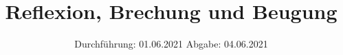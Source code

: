 

\subject{V400}
\title{Reflexion, Brechung und Beugung}
\date{%
  Durchführung: 01.06.2021
  \hspace{3em}
  Abgabe: 04.06.2021
}
 


\maketitle
\thispagestyle{empty}
\tableofcontents
\newpage






\printbibliography{}


